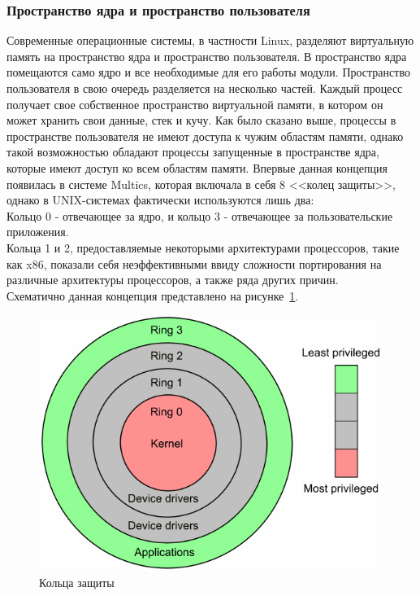 \subsubsection{Пространство ядра и пространство пользователя}\label{subsec:----}
Современные операционные системы, в частности Linux, разделяют виртуальную память на пространство ядра и пространство пользователя.
В пространство ядра помещаются само ядро и все необходимые для его работы модули.
Пространство пользователя в свою очередь разделяется на несколько частей.
Каждый процесс получает свое собственное пространство виртуальной памяти, в котором он может хранить свои данные, стек и кучу.
Как было сказано выше, процессы в пространстве пользователя не имеют доступа к чужим областям памяти, однако такой возможностью обладают процессы запущенные в пространстве ядра, которые имеют доступ ко всем областям памяти.
Впервые данная концепция появилась в системе Multics, которая включала в себя 8 <<колец защиты>>\footnotemark, однако в UNIX-системах фактически используются лишь два:
\\
Кольцо 0 - отвечающее за ядро, и кольцо 3 - отвечающее за пользовательские приложения.
\\
Кольца 1 и 2, предоставляемые некоторыми архитектурами процессоров, такие как x86, показали себя неэффективными ввиду сложности портирования на различные архитектуры процессоров, а также ряда других причин.
\\
Схематично данная концепция представлено на рисунке~\ref{fig:rings}.


\begin{figure}[H]
    \centering
    \includegraphics[scale=0.5,width=\textwidth]{inc/img/rings}
    \caption{Кольца защиты}
    \label{fig:rings}
\end{figure}

